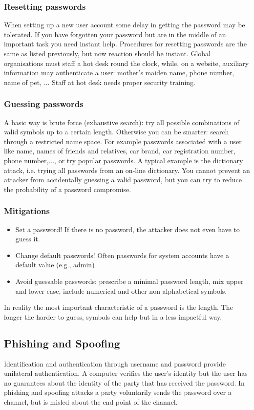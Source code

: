 \documentclass[a4paper, 10pt, titlepage]{article}
\begin{document}
\subsubsection*{Resetting passwords}
When setting up a new user account some delay in getting the
password may be tolerated. If you have forgotten your password but are in the middle of an important task you need instant help. Procedures for resetting passwords are the same as listed previously,
but now reaction should be instant. Global organisations must staff a hot desk round the clock, while, on a website, auxiliary information may authenticate a user: mother’s maiden name, phone number, name of pet, ... Staff at hot desk needs proper security training.

\subsubsection*{Guessing passwords}
A basic way is brute force (exhaustive search): try all possible combinations of valid symbols up to a certain length. Otherwise you can be smarter: search through a restricted name space. For example passwords associated with a user like name, names of friends and relatives, car brand, car registration number, phone number,..., or try popular passwords. A typical example is the dictionary attack, i.e. trying all passwords from an on-line dictionary. You cannot prevent an attacker from accidentally guessing a valid password, but you can try to reduce the probability of a password compromise.

\subsubsection*{Mitigations}
\begin{itemize}
\item Set a password! If there is no password, the attacker does not even have to guess it.
\item Change default passwords! Often passwords for system accounts have a default value (e.g., admin)
\item Avoid guessable passwords: prescribe a minimal password length, mix upper and lower case, include numerical and other non-alphabetical symbols.
\end{itemize}
In reality the most important characteristic of a password is the length. The longer the harder to guess, symbols can help but in a less impactful way.

\subsection{Phishing and Spoofing}
Identification and authentication through username and password provide unilateral authentication. A computer verifies the user’s identity but the user has no guarantees about the identity of the party that has received the password. In phishing and spoofing attacks a party voluntarily sends the password over a channel, but is misled about the end point of the channel.
\end{document}
